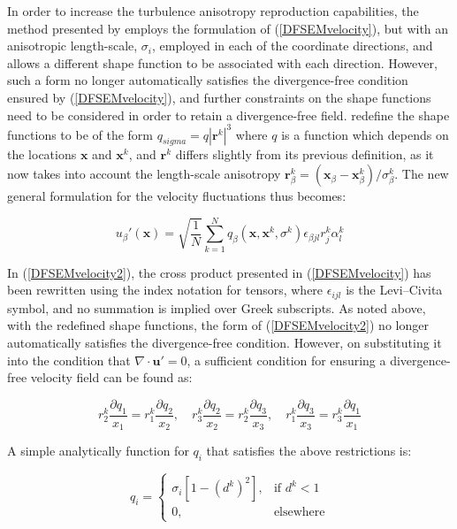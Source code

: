 In order to increase the turbulence anisotropy reproduction capabilities, the method presented by \cite{poletto2013} employs the formulation of (\ref{DFSEMvelocity}), but with an anisotropic length-scale, $\sigma_i$, employed in each of the coordinate directions, and allows a different shape function to be associated with each direction. However, such a form no longer automatically satisfies the divergence-free condition ensured by (\ref{DFSEMvelocity}), and further constraints on the shape functions need to be considered in order to retain a divergence-free field.  \cite{poletto2013} redefine the shape functions to be of the form $q_{sigma}=q|\boldsymbol{r}^k|^3$ where $q$ is a function which depends on the locations $\boldsymbol{x}$ and $\boldsymbol{x}^k$, and $\boldsymbol{r}^k$ differs slightly from its previous definition, as it now takes into account the length-scale anisotropy $\boldsymbol{r}_{\beta}^k=(\boldsymbol{x}_{\beta}-\boldsymbol{x}_{\beta}^k)/\sigma_{\beta}^k$. The new general formulation for the velocity fluctuations thus becomes:

\begin{equation} \label{DFSEMvelocity2}
	u_{\beta}'(\boldsymbol{x}) = \sqrt{\frac{1}{N}}\sum_{k=1}^N q_{\beta}\left(\boldsymbol{x},\boldsymbol{x}^k,\sigma^k\right) \epsilon_{\beta j l}r_j^k \alpha_l^k
\end{equation}


\noindent In (\ref{DFSEMvelocity2}), the cross product presented in (\ref{DFSEMvelocity}) has been rewritten using the index notation for tensors, where $\epsilon_{ijl}$ is the Levi–Civita symbol, and no summation is implied over Greek subscripts. As noted above, with the redefined shape functions, the form of (\ref{DFSEMvelocity2}) no longer automatically satisfies the divergence-free condition. However, on substituting it into the condition that $\nabla\cdot\boldsymbol{u}'=0$, a sufficient condition for ensuring a divergence-free velocity field can be found as:

\begin{equation}
	r_2^k\frac{\partial q_1}{x_1} = r_1^k\frac{\partial q_2}{x_2},\quad
	r_3^k\frac{\partial q_2}{x_2} = r_2^k\frac{\partial q_3}{x_3},\quad
	r_1^k\frac{\partial q_3}{x_3} = r_3^k\frac{\partial q_1}{x_1}
\end{equation}

\noindent A simple analytically function for $q_i$ that satisfies the above restrictions is:

\begin{equation} \label{qequation}
	q_i =
	\begin{cases}
		\sigma_i\left[1-(d^k)^2\right], & \text{if } d^k<1 \\
		0, & \text{elsewhere}
	\end{cases}
\end{equation}

